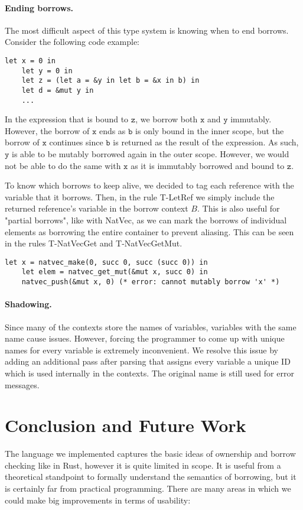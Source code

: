 \documentclass[letterpaper,11pt]{article}
\begin{document}
\paragraph{Ending borrows.}
The most difficult aspect of this type system is knowing when to end borrows. Consider the following code example:
\begin{lstlisting}[language=caml]
    let x = 0 in 
    let y = 0 in 
    let z = (let a = &y in let b = &x in b) in 
    let d = &mut y in 
    ...
\end{lstlisting}
In the expression that is bound to $\mathtt{z}$, we borrow both $\mathtt{x}$ and $\mathtt{y}$ immutably.
However, the borrow of $\mathtt{x}$ ends as $\mathtt{b}$ is only bound in the inner scope, 
but the borrow of $\mathtt{x}$ continues since $\mathtt{b}$ is returned as the result of the expression.
As such, $\mathtt{y}$ is able to be mutably borrowed again in the outer scope. However, we would not be 
able to do the same with $\mathtt{x}$ as it is immutably borrowed and bound to $\mathtt{z}$.

To know which borrows to keep alive, we decided to tag each reference with the variable that it borrows.
Then, in the rule T-LetRef we simply include the returned reference's variable in the borrow context $B$.
This is also useful for "partial borrows", like with NatVec, as we can mark the borrows of individual
elements as borrowing the entire container to prevent aliasing. This can be seen in the rules T-NatVecGet
and T-NatVecGetMut.
\begin{lstlisting}[language=caml]
    let x = natvec_make(0, succ 0, succ (succ 0)) in
    let elem = natvec_get_mut(&mut x, succ 0) in
    natvec_push(&mut x, 0) (* error: cannot mutably borrow 'x' *)
\end{lstlisting}

\paragraph{Shadowing.} Since many of the contexts store the names of variables,
variables with the same name cause issues. However, forcing the programmer to 
come up with unique names for every variable is extremely inconvenient. We resolve this issue
by adding an additional pass after parsing that assigns every variable a unique ID which is used internally
in the contexts. The original name is still used for error messages.


\section{Conclusion and Future Work}
The language we implemented captures the basic ideas of ownership and borrow checking like in Rust, however it is quite limited in scope. It is useful from a theoretical standpoint to formally understand the semantics of borrowing, but
it is certainly far from practical programming. There are many areas in which we could make big improvements in terms of usability:
\end{document}
